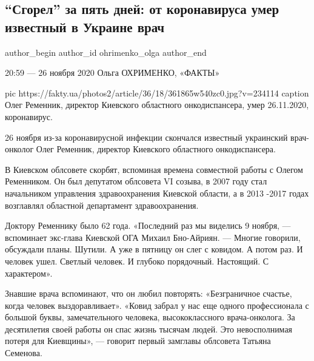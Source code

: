  
 
 
 
 
 
\subsection{\enquote{Сгорел} за пять дней: от коронавируса умер известный в Украине врач}
\label{sec:26_11_2020.news.ua.fakty.ohrimenko_olga.1.death_covid_oleg_remennik}
\ifcmt
	author_begin
   author_id ohrimenko_olga
	author_end
\fi


20:59 — 26 ноября 2020
Ольга ОХРИМЕНКО, «ФАКТЫ»

\ifcmt
pic https://fakty.ua/photos2/article/36/18/361865w540zc0.jpg?v=234114
caption Олег Ременник, директор Киевского областного онкодиспансера, умер 26.11.2020, коронавирус.
\fi

26 ноября из-за коронавирусной инфекции скончался известный украинский
врач-онколог Олег Ременник, директор Киевского областного онкодиспансера.

В Киевском облсовете скорбят, вспоминая времена совместной работы с Олегом
Ременником. Он был депутатом облсовета VI созыва, в 2007 году стал
начальником управления здравоохранения Киевской области, а в 2013 -2017
годах возглавлял областной департамент здравоохранения.

Доктору Ременнику было 62 года. «Последний раз мы виделись 9 ноября,
— вспоминает экс-глава Киевской ОГА Михаил Бно-Айриян. — Многие говорили,
обсуждали планы. Шутили. А уже в пятницу он слег с ковидом. А потом раз.
И человек ушел. Светлый человек. И глубоко порядочный. Настоящий.
С характером».

Знавшие врача вспоминают, что он любил повторять: «Безграничное счастье,
когда человек выздоравливает». «Ковид забрал у нас еще одного
профессионала с большой буквы, замечательного человека, высококлассного
врача-онколога. За десятилетия своей работы он спас жизнь тысячам людей.
Это невосполнимая потеря для Киевщины», — говорит первый замглавы
облсовета Татьяна Семенова.

